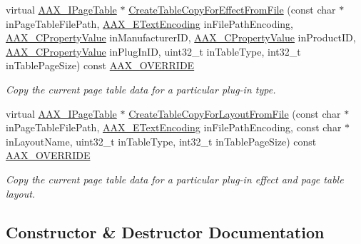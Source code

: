 \begin{DoxyCompactItemize}
virtual \hyperlink{a00107}{A\+A\+X\+\_\+\+I\+Page\+Table} $\ast$ \hyperlink{a00132_aca7ea0ddba3b3a6ae714813f12ec0515}{Create\+Table\+Copy\+For\+Effect\+From\+File} (const char $\ast$in\+Page\+Table\+File\+Path, \hyperlink{a00206_a8152e57310850693e4e7f00fc4922d74}{A\+A\+X\+\_\+\+E\+Text\+Encoding} in\+File\+Path\+Encoding, \hyperlink{a00149_ab247c0d8686c14e05cbb567ef276f249}{A\+A\+X\+\_\+\+C\+Property\+Value} in\+Manufacturer\+I\+D, \hyperlink{a00149_ab247c0d8686c14e05cbb567ef276f249}{A\+A\+X\+\_\+\+C\+Property\+Value} in\+Product\+I\+D, \hyperlink{a00149_ab247c0d8686c14e05cbb567ef276f249}{A\+A\+X\+\_\+\+C\+Property\+Value} in\+Plug\+In\+I\+D, uint32\+\_\+t in\+Table\+Type, int32\+\_\+t in\+Table\+Page\+Size) const \hyperlink{a00149_ac2f24a5172689ae684344abdcce55463}{A\+A\+X\+\_\+\+O\+V\+E\+R\+R\+I\+D\+E}
\begin{DoxyCompactList}\small\item\em Copy the current page table data for a particular plug-\/in type. \end{DoxyCompactList}\item 
virtual \hyperlink{a00107}{A\+A\+X\+\_\+\+I\+Page\+Table} $\ast$ \hyperlink{a00132_afc6f8557185c674951f9c4568a9a95b3}{Create\+Table\+Copy\+For\+Layout\+From\+File} (const char $\ast$in\+Page\+Table\+File\+Path, \hyperlink{a00206_a8152e57310850693e4e7f00fc4922d74}{A\+A\+X\+\_\+\+E\+Text\+Encoding} in\+File\+Path\+Encoding, const char $\ast$in\+Layout\+Name, uint32\+\_\+t in\+Table\+Type, int32\+\_\+t in\+Table\+Page\+Size) const \hyperlink{a00149_ac2f24a5172689ae684344abdcce55463}{A\+A\+X\+\_\+\+O\+V\+E\+R\+R\+I\+D\+E}
\begin{DoxyCompactList}\small\item\em Copy the current page table data for a particular plug-\/in effect and page table layout. \end{DoxyCompactList}\end{DoxyCompactItemize}


\subsection{Constructor \& Destructor Documentation}
\hypertarget{a00132_ae2076dd569e3ae5e2bdc3934e3392493}{}

